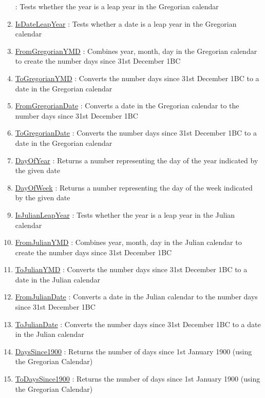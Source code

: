 \begin{enumerate}
: Tests whether the year is a leap year in the Gregorian calendar
\item \hyperlink{ecldoc:date.isdateleapyear}{IsDateLeapYear}
: Tests whether a date is a leap year in the Gregorian calendar
\item \hyperlink{ecldoc:date.fromgregorianymd}{FromGregorianYMD}
: Combines year, month, day in the Gregorian calendar to create the number days since 31st December 1BC
\item \hyperlink{ecldoc:date.togregorianymd}{ToGregorianYMD}
: Converts the number days since 31st December 1BC to a date in the Gregorian calendar
\item \hyperlink{ecldoc:date.fromgregoriandate}{FromGregorianDate}
: Converts a date in the Gregorian calendar to the number days since 31st December 1BC
\item \hyperlink{ecldoc:date.togregoriandate}{ToGregorianDate}
: Converts the number days since 31st December 1BC to a date in the Gregorian calendar
\item \hyperlink{ecldoc:date.dayofyear}{DayOfYear}
: Returns a number representing the day of the year indicated by the given date
\item \hyperlink{ecldoc:date.dayofweek}{DayOfWeek}
: Returns a number representing the day of the week indicated by the given date
\item \hyperlink{ecldoc:date.isjulianleapyear}{IsJulianLeapYear}
: Tests whether the year is a leap year in the Julian calendar
\item \hyperlink{ecldoc:date.fromjulianymd}{FromJulianYMD}
: Combines year, month, day in the Julian calendar to create the number days since 31st December 1BC
\item \hyperlink{ecldoc:date.tojulianymd}{ToJulianYMD}
: Converts the number days since 31st December 1BC to a date in the Julian calendar
\item \hyperlink{ecldoc:date.fromjuliandate}{FromJulianDate}
: Converts a date in the Julian calendar to the number days since 31st December 1BC
\item \hyperlink{ecldoc:date.tojuliandate}{ToJulianDate}
: Converts the number days since 31st December 1BC to a date in the Julian calendar
\item \hyperlink{ecldoc:date.dayssince1900}{DaysSince1900}
: Returns the number of days since 1st January 1900 (using the Gregorian Calendar)
\item \hyperlink{ecldoc:date.todayssince1900}{ToDaysSince1900}
: Returns the number of days since 1st January 1900 (using the Gregorian Calendar)

\end{enumerate}
